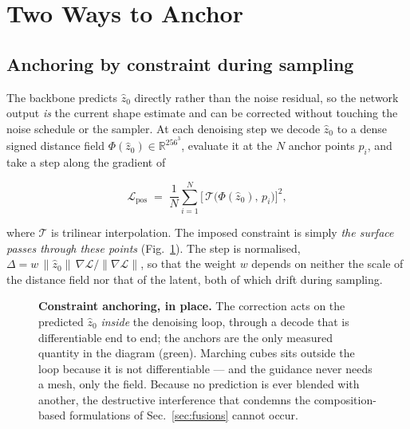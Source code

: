 \documentclass[conference]{IEEEtran}
\begin{document}
\section{Two Ways to Anchor}

\subsection{Anchoring by constraint during sampling}
\label{sec:constraint}

The backbone predicts $\hat{z}_0$ directly rather than the noise residual, so the
network output \emph{is} the current shape estimate and can be corrected without
touching the noise schedule or the sampler. At each denoising step we decode
$\hat{z}_0$ to a dense signed distance field $\Phi(\hat{z}_0) \in
\mathbb{R}^{256^3}$, evaluate it at the $N$ anchor points $p_i$, and take a step
along the gradient of

\begin{equation}
  \mathcal{L}_{\text{pos}} \;=\; \frac{1}{N}\sum_{i=1}^{N}
  \Big[\, \mathcal{T}\big(\Phi(\hat{z}_0),\, p_i \big) \Big]^2 ,
  \label{eq:loss}
\end{equation}

where $\mathcal{T}$ is trilinear interpolation. The imposed constraint is simply
\emph{the surface passes through these points} (Fig.~\ref{fig:method}). The step is
normalised, $\Delta = w \,\lVert \hat{z}_0 \rVert \, \nabla \mathcal{L} / \lVert
\nabla \mathcal{L}\rVert$, so that the weight $w$ depends on neither the scale of the
distance field nor that of the latent, both of which drift during sampling.

\begin{figure}[t]
\centering
\resizebox{\textwidth}{!}{}
\caption{\textbf{Constraint anchoring, in place.} The correction acts on the predicted
$\hat{z}_0$ \emph{inside} the denoising loop, through a decode that is differentiable
end to end; the anchors are the only measured quantity in the diagram (green).
Marching cubes sits outside the loop because it is not differentiable --- and the
guidance never needs a mesh, only the field. Because no prediction is ever blended
with another, the destructive interference that condemns the composition-based
formulations of Sec.~\ref{sec:fusions} cannot occur.}
\label{fig:method}
\end{figure}
\end{document}
